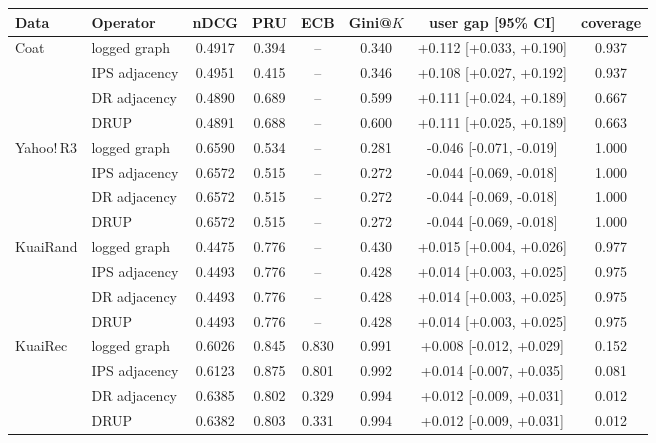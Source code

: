 \begin{tabular}{llcccccc}
\toprule
Data & Operator & nDCG & PRU & ECB & Gini@$K$ & user gap [95\% CI] & coverage\\
\midrule
Coat & logged graph & 0.4917 & 0.394 & -- & 0.340 & +0.112 [+0.033, +0.190] & 0.937\\
 & IPS adjacency & 0.4951 & 0.415 & -- & 0.346 & +0.108 [+0.027, +0.192] & 0.937\\
 & DR adjacency & 0.4890 & 0.689 & -- & 0.599 & +0.111 [+0.024, +0.189] & 0.667\\
 & DRUP & 0.4891 & 0.688 & -- & 0.600 & +0.111 [+0.025, +0.189] & 0.663\\
\midrule
Yahoo!\,R3 & logged graph & 0.6590 & 0.534 & -- & 0.281 & -0.046 [-0.071, -0.019] & 1.000\\
 & IPS adjacency & 0.6572 & 0.515 & -- & 0.272 & -0.044 [-0.069, -0.018] & 1.000\\
 & DR adjacency & 0.6572 & 0.515 & -- & 0.272 & -0.044 [-0.069, -0.018] & 1.000\\
 & DRUP & 0.6572 & 0.515 & -- & 0.272 & -0.044 [-0.069, -0.018] & 1.000\\
\midrule
KuaiRand & logged graph & 0.4475 & 0.776 & -- & 0.430 & +0.015 [+0.004, +0.026] & 0.977\\
 & IPS adjacency & 0.4493 & 0.776 & -- & 0.428 & +0.014 [+0.003, +0.025] & 0.975\\
 & DR adjacency & 0.4493 & 0.776 & -- & 0.428 & +0.014 [+0.003, +0.025] & 0.975\\
 & DRUP & 0.4493 & 0.776 & -- & 0.428 & +0.014 [+0.003, +0.025] & 0.975\\
\midrule
KuaiRec & logged graph & 0.6026 & 0.845 & 0.830 & 0.991 & +0.008 [-0.012, +0.029] & 0.152\\
 & IPS adjacency & 0.6123 & 0.875 & 0.801 & 0.992 & +0.014 [-0.007, +0.035] & 0.081\\
 & DR adjacency & 0.6385 & 0.802 & 0.329 & 0.994 & +0.012 [-0.009, +0.031] & 0.012\\
 & DRUP & 0.6382 & 0.803 & 0.331 & 0.994 & +0.012 [-0.009, +0.031] & 0.012\\
\bottomrule
\end{tabular}
